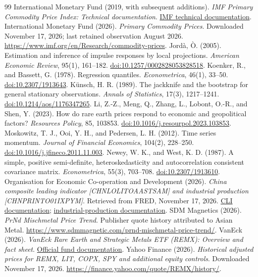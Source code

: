 \begin{thebibliography}{99}
 International Monetary Fund (2019, with subsequent additions). \textit{IMF Primary Commodity Price Index: Technical documentation}. \href{https://www.imf.org/-/media/files/research/commodityprices/monthly/pcps-technical-documentation.pdf}{IMF technical documentation}.
 International Monetary Fund (2026). \textit{Primary Commodity Prices}. Downloaded November 17, 2026; last retained observation August 2026. \url{https://www.imf.org/en/Research/commodity-prices}.
 Jordà, Ò. (2005). Estimation and inference of impulse responses by local projections. \textit{American Economic Review}, 95(1), 161–182. \href{https://doi.org/10.1257/0002828053828518}{doi:10.1257/0002828053828518}.
 Koenker, R., and Bassett, G. (1978). Regression quantiles. \textit{Econometrica}, 46(1), 33–50. \href{https://doi.org/10.2307/1913643}{doi:10.2307/1913643}.
 Künsch, H. R. (1989). The jackknife and the bootstrap for general stationary observations. \textit{Annals of Statistics}, 17(3), 1217–1241. \href{https://doi.org/10.1214/aos/1176347265}{doi:10.1214/aos/1176347265}.
 Li, Z.-Z., Meng, Q., Zhang, L., Lobont, O.-R., and Shen, Y. (2023). How do rare earth prices respond to economic and geopolitical factors? \textit{Resources Policy}, 85, 103853. \href{https://doi.org/10.1016/j.resourpol.2023.103853}{doi:10.1016/j.resourpol.2023.103853}.
 Moskowitz, T. J., Ooi, Y. H., and Pedersen, L. H. (2012). Time series momentum. \textit{Journal of Financial Economics}, 104(2), 228–250. \href{https://doi.org/10.1016/j.jfineco.2011.11.003}{doi:10.1016/j.jfineco.2011.11.003}.
 Newey, W. K., and West, K. D. (1987). A simple, positive semi-definite, heteroskedasticity and autocorrelation consistent covariance matrix. \textit{Econometrica}, 55(3), 703–708. \href{https://doi.org/10.2307/1913610}{doi:10.2307/1913610}.
 Organisation for Economic Co-operation and Development (2026). \textit{China composite leading indicator [CHNLOLITOAASTSAM] and industrial production [CHNPRINTO01IXPYM]}. Retrieved from FRED, November 17, 2026. \href{https://fred.stlouisfed.org/series/CHNLOLITOAASTSAM}{CLI documentation}; \href{https://fred.stlouisfed.org/series/CHNPRINTO01IXPYM}{industrial-production documentation}.
 SDM Magnetics (2026). \textit{PrNd Mischmetal Price Trend}. Publisher quote history attributed to Asian Metal. \url{https://www.sdmmagnetic.com/prnd-mischmetal-price-trend/}.
 VanEck (2026). \textit{VanEck Rare Earth and Strategic Metals ETF (REMX): Overview and fact sheet}. \href{https://www.vaneck.com/us/en/investments/rare-earth-strategic-metals-etf-remx/overview/}{Official fund documentation}.
 Yahoo Finance (2026). \textit{Historical adjusted prices for REMX, LIT, COPX, SPY and additional equity controls}. Downloaded November 17, 2026. \url{https://finance.yahoo.com/quote/REMX/history/}.
\end{thebibliography}
